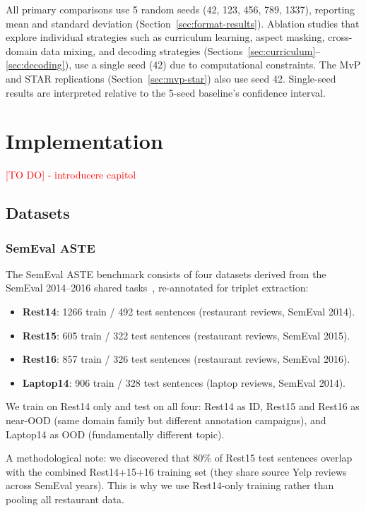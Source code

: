 \documentclass[12pt,a4paper]{report}
\begin{document}
All primary comparisons use 5 random seeds (42, 123, 456, 789, 1337), reporting mean and standard deviation (Section~\ref{sec:format-results}). Ablation studies that explore individual strategies such as curriculum learning, aspect masking, cross-domain data mixing, and decoding strategies (Sections~\ref{sec:curriculum}--\ref{sec:decoding}), use a single seed (42) due to computational constraints. The MvP and STAR replications (Section~\ref{sec:mvp-star}) also use seed 42. Single-seed results are interpreted relative to the 5-seed baseline's confidence interval.



\chapter{Implementation}\label{ch:implementation}
\textcolor{red}{[TO DO] - introducere capitol}

\section{Datasets}\label{sec:datasets}

\subsection{SemEval ASTE}

The SemEval ASTE benchmark consists of four datasets derived from the SemEval 2014--2016 shared tasks~\cite{pontiki2014semeval, pontiki2015semeval, pontiki2016semeval}, re-annotated for triplet extraction:

\begin{itemize}
    \item \textbf{Rest14}: 1266 train / 492 test sentences (restaurant reviews, SemEval 2014).
    \item \textbf{Rest15}: 605 train / 322 test sentences (restaurant reviews, SemEval 2015).
    \item \textbf{Rest16}: 857 train / 326 test sentences (restaurant reviews, SemEval 2016).
    \item \textbf{Laptop14}: 906 train / 328 test sentences (laptop reviews, SemEval 2014).
\end{itemize}

We train on Rest14 only and test on all four: Rest14 as ID, Rest15 and Rest16 as near-OOD (same domain family but different annotation campaigns), and Laptop14 as OOD (fundamentally different topic).

A methodological note: we discovered that 80\% of Rest15 test sentences overlap with the combined Rest14+15+16 training set (they share source Yelp reviews across SemEval years). This is why we use Rest14-only training rather than pooling all restaurant data.
\end{document}
